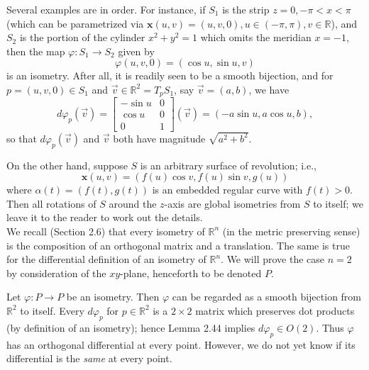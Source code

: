 \documentclass[leqno]{book}
\begin{document}
Several examples are in order.  For instance, if $S_1$ is the strip $z=0,-\pi<x<\pi$ (which can be parametrized via $\mathbf x(u,v)=(u,v,0),u\in(-\pi,\pi),v\in\mathbb R$), and $S_2$ is the portion of the cylinder $x^2+y^2=1$ which omits the meridian $x=-1$, then the map $\varphi:S_1\to S_2$ given by
$$\varphi(u,v,0)=(\cos u,\sin u,v)$$
is an isometry.  After all, it is readily seen to be a smooth bijection, and for $p=(u,v,0)\in S_1$ and $\vec v\in\mathbb R^2=T_pS_1$, say $\vec v=(a,b)$, we have
$$d\varphi_p(\vec v)=\begin{bmatrix}-\sin u&0\\\cos u&0\\0&1\end{bmatrix}(\vec v)=(-a\sin u,a\cos u,b),$$
so that $d\varphi_p(\vec v)$ and $\vec v$ both have magnitude $\sqrt{a^2+b^2}$.

On the other hand, suppose $S$ is an arbitrary surface of revolution; i.e.,
$$\mathbf x(u,v)=(f(u)\cos v,f(u)\sin v,g(u))$$
where $\alpha(t)=(f(t),g(t))$ is an embedded regular curve with $f(t)>0$.  Then all rotations of $S$ around the $z$-axis are global isometries from $S$ to itself; we leave it to the reader to work out the details.\\

\noindent We recall (Section 2.6) that every isometry of $\mathbb R^n$ (in the metric preserving sense) is the composition of an orthogonal matrix and a translation.  The same is true for the differential definition of an isometry of $\mathbb R^n$.  We will prove the case $n=2$ by consideration of the $xy$-plane, henceforth to be denoted $P$. %

Let $\varphi:P\to P$ be an isometry.  Then $\varphi$ can be regarded as a smooth bijection from $\mathbb R^2$ to itself.  Every $d\varphi_p$ for $p\in\mathbb R^2$ is a $2\times 2$ matrix which preserves dot products (by definition of an isometry); hence Lemma 2.44 implies $d\varphi_p\in O(2)$.  Thus $\varphi$ has an orthogonal differential at every point.  However, we do not yet know if its differential is the \emph{same} at every point.
\end{document}
